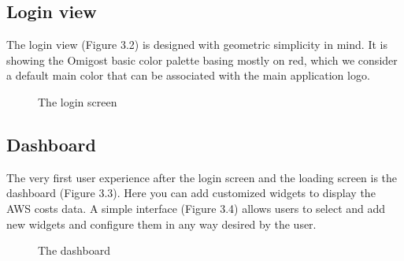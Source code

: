 \documentclass[licencjacka,en]{thesisclass}
\begin{document}
    \subsection{Login view}


    The login view (Figure 3.2) is designed with geometric simplicity in mind.
    It is showing the Omigost basic color palette basing mostly on red, which we consider
    a default main color that can be associated with the main application logo.

    \begin{figure}[H]
      \caption{The login screen\label{fig:scr-login}}
    \end{figure}

    \subsection{Dashboard}

    The very first user experience after the login screen and the loading screen is the dashboard (Figure 3.3).
    Here you can add customized widgets to display the AWS costs data.
    A simple interface (Figure 3.4) allows users to select and add new widgets
    and configure them in any way desired by the user.

    \begin{figure}[H]
      \caption{The dashboard\label{fig:scr-dashboard}}
    \end{figure}
\end{document}
